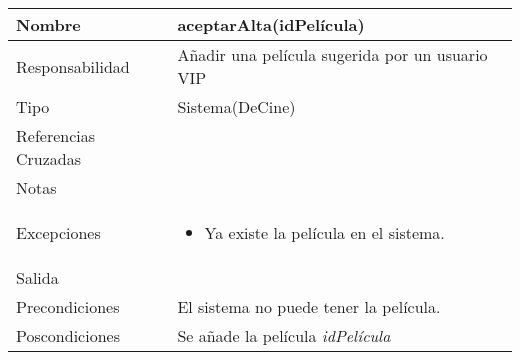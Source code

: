 \documentclass{article}
\begin{document}
\begin{table}[h]
\begin{tabular}{|l|l|l|l|l|l|}
\hline
\multicolumn{2}{|p{3cm}|}{Nombre} & \multicolumn{4}{p{10cm}|}{\textbf{aceptarAlta(idPelícula)}}\\
\hline
\multicolumn{2}{|p{3cm}|}{Responsabilidad} & \multicolumn{4}{p{10cm}|}{Añadir una película sugerida por un usuario VIP} \\
\hline
\multicolumn{2}{|p{3cm}|}{Tipo} & \multicolumn{4}{p{10cm}|}{Sistema(DeCine)} \\
\hline
\multicolumn{2}{|p{3cm}|}{Referencias Cruzadas} & \multicolumn{4}{p{10cm}|}{} \\
\hline
\multicolumn{2}{|p{3cm}|}{Notas} & \multicolumn{4}{p{10cm}|}{} \\
\hline
\multicolumn{2}{|p{3cm}|}{Excepciones} & \multicolumn{4}{p{10cm}|}{\begin{itemize}
\item Ya existe la película en el sistema.
\end{itemize}} \\
\hline
\multicolumn{2}{|p{3cm}|}{Salida} & \multicolumn{4}{p{10cm}|}{} \\
\hline
\multicolumn{2}{|p{3cm}|}{Precondiciones} & \multicolumn{4}{p{10cm}|}{El sistema no puede tener la película.} \\
\hline
\multicolumn{2}{|p{3cm}|}{Poscondiciones} & \multicolumn{4}{p{10cm}|}{Se añade la película \textit{idPelícula}} \\
\hline
\end{tabular}
\end{table}
\end{document}
